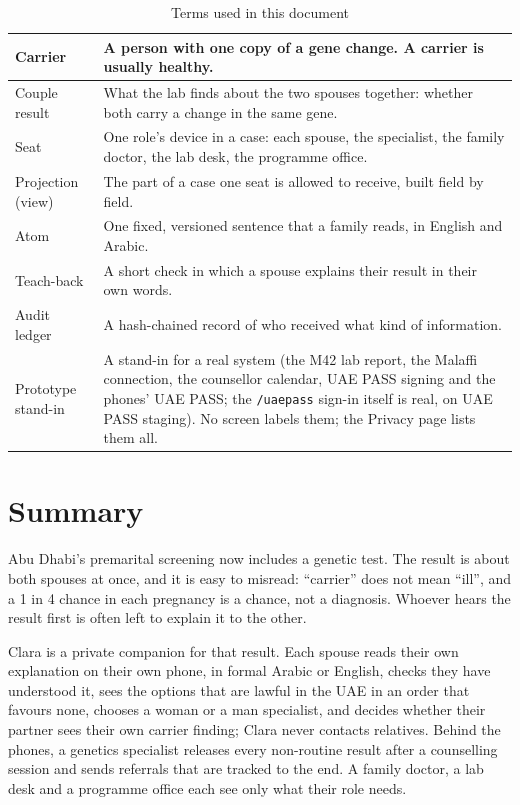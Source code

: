 \documentclass[10.5pt,a4paper]{article}
\newcommand{\chapterbreak}{}
\let\oldsection\section
\renewcommand{\section}{\chapterbreak\oldsection}
\newcommand{\toprl}{\arrayrulecolor{ink}\toprule\arrayrulecolor{rule}}
\newcommand{\code}[1]{\texttt{\small #1}}
\begin{document}
{
\begin{xltabular}{\textwidth}{@{}P{3.6cm}L@{}}
\caption{Terms used in this document}\\
\toprl
Carrier & A person with one copy of a gene change. A carrier is usually healthy.\\
\midrule
Couple result & What the lab finds about the two spouses together: whether both carry a change in the same gene.\\
\midrule
Seat & One role's device in a case: each spouse, the specialist, the family doctor, the lab desk, the programme office.\\
\midrule
Projection (view) & The part of a case one seat is allowed to receive, built field by field.\\
\midrule
Atom & One fixed, versioned sentence that a family reads, in English and Arabic.\\
\midrule
Teach-back & A short check in which a spouse explains their result in their own words.\\
\midrule
Audit ledger & A hash-chained record of who received what kind of information.\\
\midrule
Prototype stand-in & A stand-in for a real system (the M42 lab report, the Malaffi connection, the counsellor calendar, UAE PASS signing and the phones' UAE PASS; the \code{/uaepass} sign-in itself is real, on UAE PASS staging). No screen labels them; the Privacy page lists them all.\\
\bottomrule
\end{xltabular}}

\clearpage
\tableofcontents
\clearpage

\section{Summary}

Abu Dhabi's premarital screening now includes a genetic test. The result is about both spouses at once, and it is easy
to misread: ``carrier'' does not mean ``ill'', and a 1 in 4 chance in each pregnancy is a chance, not a diagnosis.
Whoever hears the result first is often left to explain it to the other.

Clara is a private companion for that result. Each spouse reads their own explanation on their own phone, in formal
Arabic or English, checks they have understood it, sees the options that are lawful in the UAE in an order that
favours none, chooses a woman or a man specialist, and decides whether their partner sees their own carrier finding; Clara never contacts relatives. Behind the
phones, a genetics specialist releases every non-routine result after a counselling session and sends referrals that
are tracked to the end. A family doctor, a lab desk and a programme office each see only what their role needs.
\end{document}
